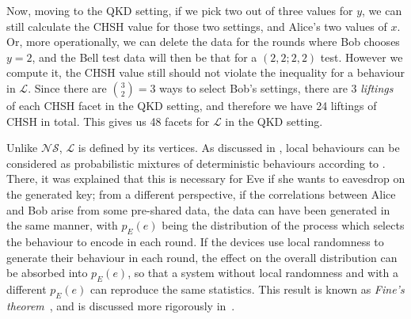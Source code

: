 \documentclass[10pt, a4paper]{article}
\numberwithin{equation}{section} %
\theoremstyle{definition}
\theoremstyle{plain}
\newcommand{\?}{\mathrel{?}} %
\newcommand{\Ls}{\mathcal{L}}
\newcommand{\NSs}{\mathcal{NS}}
\begin{document}
      Now, moving to the QKD setting, if we pick two out of three values for \(y\), we can still calculate the CHSH value for those two settings, and Alice's two values of \(x\). Or, more operationally, we can delete the data for the rounds where Bob chooses \(y=2\), and the Bell test data will then be that for a \((2,2;2,2)\) test. However we compute it, the CHSH value still should not violate the inequality for a behaviour in \(\Ls\). Since there are \(\binom{3}{2} = 3\) ways to select Bob's settings, there are 3 \emph{liftings} of each CHSH facet in the QKD setting, and therefore we have 24 liftings of CHSH in total. This gives us 48 facets for \(\Ls\) in the QKD setting.

      Unlike \(\NSs\), \(\Ls\) is defined by its vertices. As discussed in , local behaviours can be considered as probabilistic mixtures of deterministic behaviours according to . There, it was explained that this is necessary for Eve if she wants to eavesdrop on the generated key; from a different perspective, if the correlations between Alice and Bob arise from some pre-shared data, the data can have been generated in the same manner, with \(p_E(e)\) being the distribution of the process which selects the behaviour to encode in each round. If the devices use local randomness to generate their behaviour in each round, the effect on the overall distribution can be absorbed into \(p_E(e)\), so that a system without local randomness and with a different \(p_E(e)\) can reproduce the same statistics. This result is known as \emph{Fine's theorem}~\cite{FineThm}, and is discussed more rigorously in~\cite{BellNonlocality}.
\end{document}
